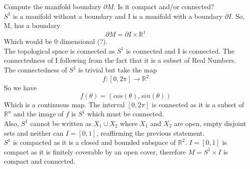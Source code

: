 \documentclass[12pt]{article}
\newcounter{alplisti}
\renewcommand{\thealplisti}{\alph{alplisti}}
\newenvironment{alplist}[1][(\thealplisti)]{\begin{list}{{\rm #1}\ }{ %
      \usecounter{alplisti} %
    \setlength{\itemsep}{0pt}
    \setlength{\parsep}{0pt}  %
     \setlength{\topsep}{0pt} %
}}{\end{list}}
\begin{document}
\begin{alplist}
 \item Compute the manifold boundary $\partial M$. 
 Is it compact and/or connected?
 \\
 $S^1$ is a manifold without a boundary and I is a manifold with a boundary $\partial I$. So, M, has a boundary 
 $$ \partial M = \partial I \times \mathbb{R}^1 $$
 Which would be 0 dimensional (?). \\
 The topological space is connected as $S^1$ is connected and I is connected. The connectedness of I following from the fact that it is a subset of Real Numbers. The connectedness of $S^1$ is trivial but take the map 
 $$ f: [0,2 \pi] \rightarrow \mathbb{R}^2 $$
 So we have 
 $$ f(\theta) = (cos(\theta), sin(\theta)) $$
 Which is a continuous map. The interval $[0, 2\pi] $ is connected as it is a subset of $\mathbb{R}^n$ and the image of $f$ is $S^1$ which must be connected. 
 \\
 Also, $S^1$ cannot be written as $X_1 \cup X_2$ where $X_1$ and $X_2$ are open, empty disjoint sets and neither can $I = [0,1]$, reaffirming the previous statement. 
 \\
 $S^1$ is compacted as it is a closed and bounded subspace of $\mathbb{R}^2$. $I=[0,1]$ is compact as it is finitely coverable by an open cover, therefore $M=S^1 \times I$ is compact and connected.  
\end{alplist}
\end{document}
